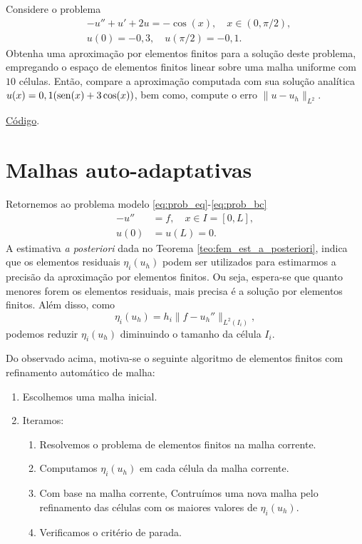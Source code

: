 \begin{exer}\label{exer:dcr}
  Considere o problema
  \begin{align}
    &-u'' + u' + 2u = -\cos(x),\quad x\in (0, \pi/2),\\
    &u(0)=-0,3,\quad u(\pi/2)=-0,1.
  \end{align}
  Obtenha uma aproximação por elementos finitos para a solução deste problema, empregando o espaço de elementos finitos linear sobre uma malha uniforme com $10$ células. Então, compare a aproximação computada com sua solução analítica $u(x) = 0,1(\operatorname{sen}(x)+3\cos(x))$, bem como, compute o erro $\|u-u_h\|_{L^2}$.
\end{exer}
\begin{resp}
  \ifispython
  \href{https://github.com/phkonzen/notas/blob/master/src/MetodoElementosFinitos/cap_mef1d/dados/exer_dcr/exer_dcr.py}{Código}.
  \fi
\end{resp}

\section{Malhas auto-adaptativas}\label{cap_mef1d_sec_adapt}

Retornemos ao problema modelo \eqref{eq:prob_eq}-\eqref{eq:prob_bc}
\begin{align}
  -u'' &= f,\quad x\in I=[0,L],\\
  u(0) &= u(L) = 0.
\end{align}
A estimativa {\it a posteriori} dada no Teorema \ref{teo:fem_est_a_posteriori}, indica que os elementos residuais $\eta_i(u_h)$ podem ser utilizados para estimarmos a precisão da aproximação por elementos finitos. Ou seja, espera-se que quanto menores forem os elementos residuais, mais precisa é a solução por elementos finitos. Além disso, como
\begin{equation}
  \eta_i(u_h) = h_i\|f - u_h''\|_{L^2(I_i)},
\end{equation}
podemos reduzir $\eta_i(u_h)$ diminuindo o tamanho da célula $I_i$.

Do observado acima, motiva-se o seguinte algoritmo de elementos finitos com refinamento automático de malha:
\begin{enumerate}
\item Escolhemos uma malha inicial.
\item Iteramos:
  \begin{enumerate}[2.]
  \item Resolvemos o problema de elementos finitos na malha corrente.
  \item Computamos $\eta_i(u_h)$ em cada célula da malha corrente.
  \item Com base na malha corrente, Contruímos uma nova malha pelo refinamento das células com os maiores valores de $\eta_i(u_h)$.
  \item Verificamos o critério de parada.
  \end{enumerate}
\end{enumerate}

